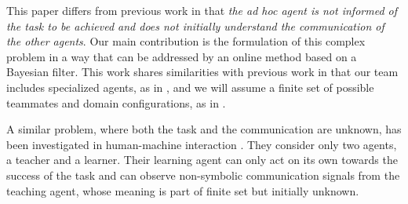 This paper differs from previous work in that \textit{the ad hoc agent is not informed of the task to be achieved and does not initially understand the communication of the other agents}. Our main contribution is the formulation of this complex problem in a way that can be addressed by an online method based on a Bayesian filter. This work shares similarities with previous work in that our team includes specialized agents, as in \cite{genter2011role}, and we will assume a finite set of possible teammates and domain configurations, as in \cite{genter2011role,barrett2011empirical,barrett2014communicating}.


A similar problem, where both the task and the communication are unknown, has been investigated in human-machine interaction \cite{grizou2014interactive}. They consider only two agents, a teacher and a learner. Their learning agent can only act on its own towards the success of the task and can observe non-symbolic communication signals from the teaching agent, whose meaning is part of finite set but initially unknown.




